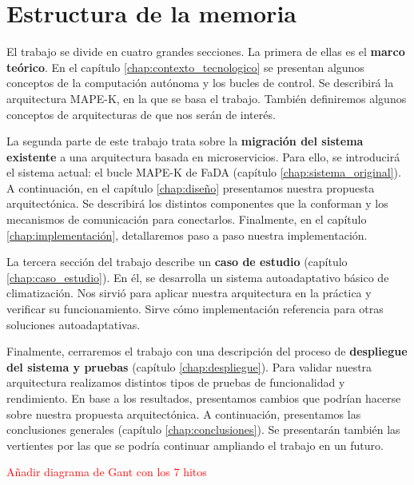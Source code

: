 \section{Estructura de la memoria}

El trabajo se divide en cuatro grandes secciones. La primera de ellas es el \textbf{marco teórico}. En el capítulo \ref{chap:contexto_tecnologico} se presentan algunos conceptos de la computación autónoma y los bucles de control. Se describirá la arquitectura MAPE-K, en la que se basa el trabajo. También definiremos algunos conceptos de arquitecturas de  que nos serán de interés.

La segunda parte de este trabajo trata sobre la \textbf{migración del sistema existente} a una arquitectura basada en microservicios. Para ello, se introducirá el sistema actual: el bucle MAPE-K  de FaDA (capítulo \ref{chap:sistema_original}). A continuación, en el capítulo \ref{chap:diseño} presentamos nuestra propuesta arquitectónica. Se describirá los distintos componentes que la conforman y los mecanismos de comunicación para conectarlos. Finalmente, en el capítulo \ref{chap:implementación}, detallaremos paso a paso nuestra implementación.

La tercera sección del trabajo describe un \textbf{caso de estudio} (capítulo \ref{chap:caso_estudio}). En él, se desarrolla un sistema autoadaptativo básico de climatización. Nos sirvió para aplicar nuestra arquitectura en la práctica y verificar su funcionamiento. Sirve cómo implementación referencia para otras soluciones autoadaptativas.

Finalmente, cerraremos el trabajo con una descripción del proceso de \textbf{despliegue del sistema y pruebas} (capítulo \ref{chap:despliegue}). Para validar nuestra arquitectura realizamos distintos tipos de pruebas de funcionalidad y rendimiento. En base a los resultados, presentamos cambios que podrían hacerse sobre nuestra propuesta arquitectónica. A continuación, presentamos las conclusiones  generales (capítulo \ref{chap:conclusiones}). Se presentarán también las vertientes por las que se podría continuar ampliando el trabajo en un futuro.



\textcolor{red}{Añadir diagrama de Gant con los 7 hitos}
